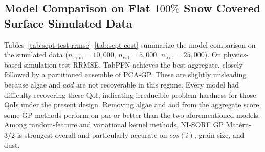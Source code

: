 \documentclass[11pt]{article}
\begin{document}


% 



\subsection{Model Comparison on Flat $100\%$ Snow Covered Surface Simulated Data}
\label{sec:sept}

Tables~\ref{tab:sept-test-rrmse}--\ref{tab:sept-cost} summarize the
model comparison on the simulated data ($n_{\mathrm{train}}=10{,}000$, $n_{\mathrm{val}}=5{,}000$, $n_{\mathrm{test}}=25{,}000$).
On physics-based simulation test RRMSE, TabPFN achieves the best aggregate, closely followed
by a partitioned ensemble of PCA-GP. These are slightly misleading because algae and $aod$ are not recoverable in this regime. Every model had difficulty recovering these QoI, indicating irreducible problem hardness for those QoIs under the present design. 
Removing algae and aod from the aggregate score, some GP methods perform on par or better than the two aforementioned models.
Among random-feature and variational kernel methods, NI-SORF GP Mat\'ern-$3/2$ is strongest
overall and particularly accurate on $cos(i)$, grain size, and dust.
\end{document}
